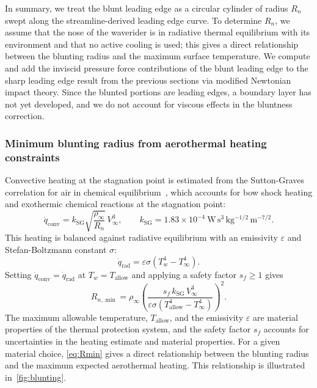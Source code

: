 \documentclass[10pt,a4paper]{article}
\begin{document}
In summary, we treat the blunt leading edge as a circular cylinder of radius $R_n$ swept along the streamline-derived leading edge curve. To determine $R_n$, we assume that the nose of the waverider is in radiative thermal equilibrium with its environment and that no active cooling is used; this gives a direct relationship between the blunting radius and the maximum surface temperature. We compute and add the inviscid pressure force contributions of the blunt leading edge to the sharp leading edge result from the previous sections via modified Newtonian impact theory. Since the blunted portions are leading edges, a boundary layer has not yet developed, and we do not account for viscous effects in the bluntness correction.

\subsubsection{Minimum blunting radius from aerothermal heating constraints}
Convective heating at the stagnation point is estimated from the Sutton-Graves correlation for air in chemical equilibrium~\citep{Sutton:1971}, which accounts for bow shock heating and exothermic chemical reactions at the stagnation point:
\begin{equation}
    \dot{q}_{\text{conv}} = k_{\text{SG}}\sqrt{\frac{\rho_\infty}{R_n}}\,V_\infty^{3},
    \qquad k_{\text{SG}} = 1.83 \times 10^{-4}\ \mathrm{W\,s^{3}\,kg^{-1/2}\,m^{-7/2}}.
    \label{eq:sutton_graves}
\end{equation}
This heating is balanced against radiative equilibrium with an emissivity $\varepsilon$ and Stefan-Boltzmann constant $\sigma$:
\begin{equation}
    \dot{q}_{\text{rad}} = \varepsilon\sigma\!\left(T_w^{4} - T_\infty^{4}\right).
    \label{eq:rad_eq}
\end{equation}
Setting $\dot{q}_{\text{conv}} = \dot{q}_{\text{rad}}$ at $T_w = T_{\text{allow}}$ and applying a safety factor $s_f \ge 1$ gives
\begin{equation}
    R_{n,\min}
    = \rho_\infty\!\left(
        \frac{s_f\,k_{\text{SG}}\,V_\infty^{3}}
                {\varepsilon\sigma\!\left(T_{\text{allow}}^{4}-T_\infty^{4}\right)}
        \right)^{2}.\label{eq:Rmin}
\end{equation}
The maximum allowable temperature, $T_{\text{allow}}$, and the emissivity $\varepsilon$ are material properties of the thermal protection system, and the safety factor $s_f$ accounts for uncertainties in the heating estimate and material properties. For a given material choice, \cref{eq:Rmin} gives a direct relationship between the blunting radius and the maximum expected aerothermal heating. This relationship is illustrated in~\cref{fig:blunting}.
\end{document}
